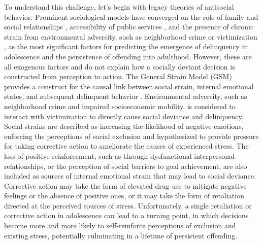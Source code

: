 \documentclass[utf8]{article}
\begin{document}
To understand this challenge, let's begin with legacy theories of antisocial behavior. Prominent sociological models have converged on the role of family and social relationships \citep{tolan1997assessment,henry2001longitudinal}, accessibility of public services \citep{molnar2008effects}, and the presence of chronic strain from environmental adversity, such as neighborhood crime or victimization \citep{gur2019burden}, as the most significant factors for predicting the emergence of delinquency in adolescence and the persistence of offending into adulthood. However, these are all exogenous factors and do not explain how a socially deviant decision is constructed from perception to action. The General Strain Model (GSM) provides a construct for the causal link between social strain, internal emotional states, and subsequent delinquent behavior \citep{agnew2001building}. Environmental adversity, such as neighborhood crime and impaired socioeconomic mobility, is considered to interact with victimization to directly cause social deviance and delinquency. Social strains are described as increasing the likelihood of negative emotions, enforcing the perceptions of social exclusion and hypothesized to provide pressure for taking corrective action to ameliorate the causes of experienced stress. The loss of positive reinforcement, such as through dysfunctional interpersonal relationships, or the perception of social barriers to goal achievement, are also included as sources of internal emotional strain that may lead to social deviance. Corrective action may take the form of elevated drug use to mitigate negative feelings or the absence of positive ones, or it may take the form of retaliation directed at the perceived sources of stress. Unfortunately, a single retaliation or corrective action in adolescence can lead to a turning point, in which decisions become more and more likely to self-reinforce perceptions of exclusion and existing stress, potentially culminating in a lifetime of persistent offending. 
\end{document}
